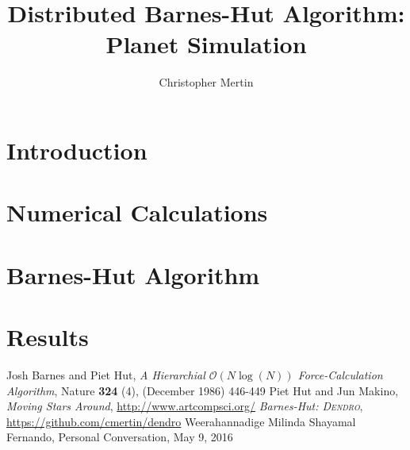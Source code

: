 \documentclass[12pt]{article}
\author{Christopher Mertin}
\title{Distributed Barnes-Hut Algorithm: Planet Simulation}
\begin{document}
\begin{titlepage}
\maketitle
\thispagestyle{empty}
\end{titlepage}

\section*{Introduction}


\section*{Numerical Calculations}


\section*{Barnes-Hut Algorithm}


\section*{Results}


\begin{thebibliography}{99}
Josh Barnes and Piet Hut, {\em A Hierarchial $\mathcal{O}\left( N\log(N)\right)$ Force-Calculation Algorithm}, Nature {\bf 324} (4), (December 1986) 446-449
 Piet Hut and Jun Makino, {\em Moving Stars Around}, \url{http://www.artcompsci.org/}
\textit{Barnes-Hut: \textsc{Dendro}}, \url{https://github.com/cmertin/dendro}
 Weerahannadige Milinda Shayamal Fernando, Personal Conversation, May 9, 2016
\end{thebibliography}
\end{document}
